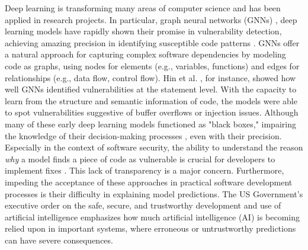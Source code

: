 \documentclass{buthesis}
\begin{document}
Deep learning is transforming many areas of computer science and has been applied in research projects. In particular, graph neural networks (GNNs) \cite{hin2022linevd}, deep learning models have rapidly shown their promise in vulnerability detection, achieving amazing precision in identifying susceptible code patterns \cite{chakraborty2021deep, Liu2020, Yaqin2020}. GNNs offer a natural approach for capturing complex software dependencies by modeling code as graphs, using nodes for elements (e.g., variables, functions) and edges for relationships (e.g., data flow, control flow). Hin et al. \cite{hin2022linevd}, for instance, showed how well GNNs identified vulnerabilities at the statement level. With the capacity to learn from the structure and semantic information of code, the models were able to spot vulnerabilities suggestive of buffer overflows or injection issues. Although many of these early deep learning models functioned as "black boxes," impairing the knowledge of their decision-making processes \cite{li2023vulanalyzer, mosolygo2021towards}, even with their precision. Especially in the context of software security, the ability to understand the reason \emph{why} a model finds a piece of code as vulnerable is crucial for developers to implement fixes \cite{USGov2023}. This lack of transparency is a major concern. Furthermore, impeding the acceptance of these approaches in practical software development processes is their difficulty in explaining model predictions. The US Government's executive order \cite{USGov2023} on the safe, secure, and trustworthy development and use of artificial intelligence emphasizes how much artificial intelligence (AI) is becoming relied upon in important systems, where erroneous or untrustworthy predictions can have severe consequences.
\end{document}
